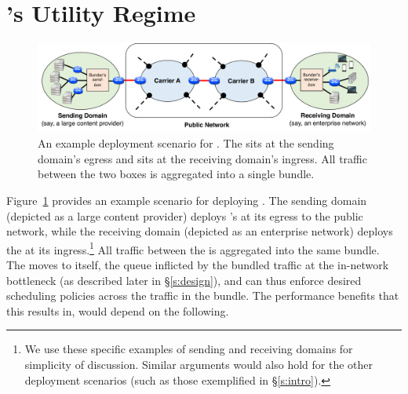 \section{\name's Utility Regime}
\label{s:deploy}

\begin{figure}
    \centering
    \includegraphics[width=\textwidth]{img/deployment-arch.pdf}
    \caption{An example deployment scenario for \name. 
    The \inbox sits at the sending domain's egress and \outbox sits at the receiving domain's ingress. All traffic between the two boxes is aggregated into a single bundle. 
    }\label{fig:deploy:arch}
\end{figure}


Figure~\ref{fig:deploy:arch} provides an example scenario for deploying \name. The sending domain (depicted as a large content provider) deploys \name's \inbox at its egress to the public network, while the receiving domain (depicted as an enterprise network) deploys the \outbox at its ingress.\footnote{We use these specific examples of sending and receiving domains for simplicity of discussion. Similar arguments would also hold for the other deployment scenarios (such as those exemplified in \S\ref{s:intro}).} All traffic between the \pair is aggregated into the same bundle. The \inbox moves to itself, the queue inflicted by the bundled traffic at the in-network bottleneck (as described later in \S\ref{s:design}), and can thus enforce desired scheduling policies across the traffic in the bundle. 
The performance benefits that this results in, would depend on the following. 

